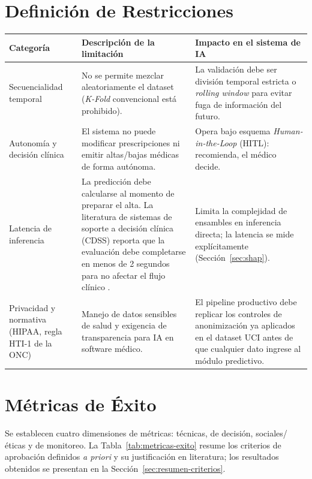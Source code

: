 \documentclass[11pt,a4paper]{article}
\begin{document}
\section{Definición de Restricciones}

\begin{longtable}{p{2.6cm}p{6.3cm}p{6.3cm}}
\toprule
\textbf{Categoría} & \textbf{Descripción de la limitación} & \textbf{Impacto en el sistema de IA} \\
\midrule
\endhead
Secuencialidad temporal & No se permite mezclar aleatoriamente el dataset (\emph{K-Fold} convencional está prohibido). & La validación debe ser división temporal estricta o \emph{rolling window} para evitar fuga de información del futuro. \\
Autonomía y decisión clínica & El sistema no puede modificar prescripciones ni emitir altas/bajas médicas de forma autónoma. & Opera bajo esquema \emph{Human-in-the-Loop} (HITL): recomienda, el médico decide. \\
Latencia de inferencia & La predicción debe calcularse al momento de preparar el alta. La literatura de sistemas de soporte a decisión clínica (CDSS) reporta que la evaluación debe completarse en menos de 2 segundos para no afectar el flujo clínico \cite{nawaz2026}. & Limita la complejidad de ensambles en inferencia directa; la latencia se mide explícitamente (Sección~\ref{sec:shap}). \\
Privacidad y normativa (HIPAA, regla HTI-1 de la ONC) & Manejo de datos sensibles de salud y exigencia de transparencia para IA en software médico. & El pipeline productivo debe replicar los controles de anonimización ya aplicados en el dataset UCI antes de que cualquier dato ingrese al módulo predictivo. \\
\bottomrule
\end{longtable}

\section{Métricas de Éxito}

Se establecen cuatro dimensiones de métricas: técnicas, de decisión, sociales/éticas y de monitoreo. La Tabla~\ref{tab:metricas-exito} resume los criterios de aprobación definidos \emph{a priori} y su justificación en literatura; los resultados obtenidos se presentan en la Sección~\ref{sec:resumen-criterios}.
\end{document}
